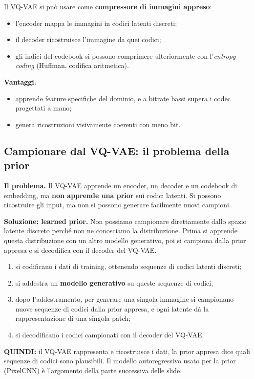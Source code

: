 \documentclass[11pt,a4paper]{article}
\begin{document}
Il VQ-VAE si può usare come \textbf{compressore di immagini appreso}:
\begin{itemize}
  \item l'encoder mappa le immagini in codici latenti discreti;
  \item il decoder ricostruisce l'immagine da quei codici;
  \item gli indici del codebook si possono comprimere ulteriormente con l'\emph{entropy coding} (Huffman, codifica aritmetica).
\end{itemize}

\textbf{Vantaggi.}
\begin{itemize}
  \item apprende feature specifiche del dominio, e a bitrate bassi supera i codec progettati a mano;
  \item genera ricostruzioni visivamente coerenti con meno bit.
\end{itemize}

\subsection{Campionare dal VQ-VAE: il problema della prior}

\textbf{Il problema.} Il VQ-VAE apprende un encoder, un decoder e un codebook di embedding, ma 
\textbf{non apprende una prior} sui codici latenti. Si possono ricostruire gli input, ma non si possono generare facilmente nuovi campioni.

\textbf{Soluzione: learned prior.} Non possiamo campionare direttamente dallo spazio latente discreto 
perché non ne conosciamo la distribuzione. Prima si apprende questa distribuzione con un altro modello
 generativo, poi si campiona dalla prior appresa e si decodifica con il decoder del VQ-VAE.
\begin{enumerate}
  \item si codificano i dati di training, ottenendo sequenze di codici latenti discreti;
  \item si addestra un \textbf{modello generativo} su queste sequenze di codici;
  \item dopo l'addestramento, per generare una singola immagine si campionano nuove sequenze di codici 
  dalla prior appresa, e ogni latente dà la rappresentazione di una singola patch;
  \item si decodificano i codici campionati con il decoder del VQ-VAE.
\end{enumerate}

\textbf{QUINDI:} il VQ-VAE rappresenta e ricostruisce i dati, la prior appresa dice quali sequenze di codici 
sono plausibili. Il modello autoregressivo usato per la prior (PixelCNN) è l'argomento della parte successiva delle slide.
\end{document}
